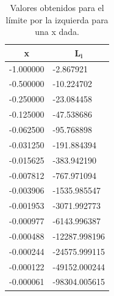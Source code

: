 \begin{minipage}{0.45\linewidth}
    \begin{table}[H]
        \centering
        \begin{tabular}{ll}
            \hline
            \multicolumn{1}{c}{\textbf{x}} & \multicolumn{1}{c}{$\mathbf{L_i}$} \\ \hline
            -1.000000                      & -2.867921                          \\
            -0.500000                      & -10.224702                         \\
            -0.250000                      & -23.084458                         \\
            -0.125000                      & -47.538686                         \\
            -0.062500                      & -95.768898                         \\
            -0.031250                      & -191.884394                        \\
            -0.015625                      & -383.942190                        \\
            -0.007812                      & -767.971094                        \\
            -0.003906                      & -1535.985547                       \\
            -0.001953                      & -3071.992773                       \\
            -0.000977                      & -6143.996387                       \\
            -0.000488                      & -12287.998196                      \\
            -0.000244                      & -24575.999115                      \\
            -0.000122                      & -49152.000244                      \\
            -0.000061                      & -98304.005615                      \\ \hline
        \end{tabular}
        \caption{Valores obtenidos para el límite por la izquierda para una x dada.}
        \label{table:limiteizquierda}
    \end{table}
\end{minipage}
\hspace{0.5cm}
